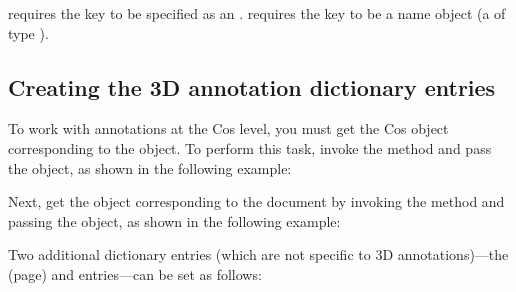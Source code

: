 \documentclass[letterpaper,12pt,english,openany,oneside]{sphinxmanual}
\begin{document}
 requires the key to be specified as an .  requires the key to be a name object (a  of type  ).


\subsection{Creating the 3D annotation dictionary entries}
\label{\detokenize{Plugins_3D_samples:creating-the-3d-annotation-dictionary-entries}}
To work with annotations at the Cos level, you must get the Cos object corresponding to the  object. To perform this task, invoke the  method and pass the  object, as shown in the following example:

\begin{sphinxVerbatim}[commandchars=\\\{\}]
   
\end{sphinxVerbatim}

Next, get the  object corresponding to the document by invoking the  method and passing the  object, as shown in the following example:

\begin{sphinxVerbatim}[commandchars=\\\{\}]
   
\end{sphinxVerbatim}

Two additional dictionary entries (which are not specific to 3D annotations)—the  (page) and  entries—can be set as follows:

\begin{sphinxVerbatim}[commandchars=\\\{\}]
  
  
    
\end{sphinxVerbatim}
\end{document}
